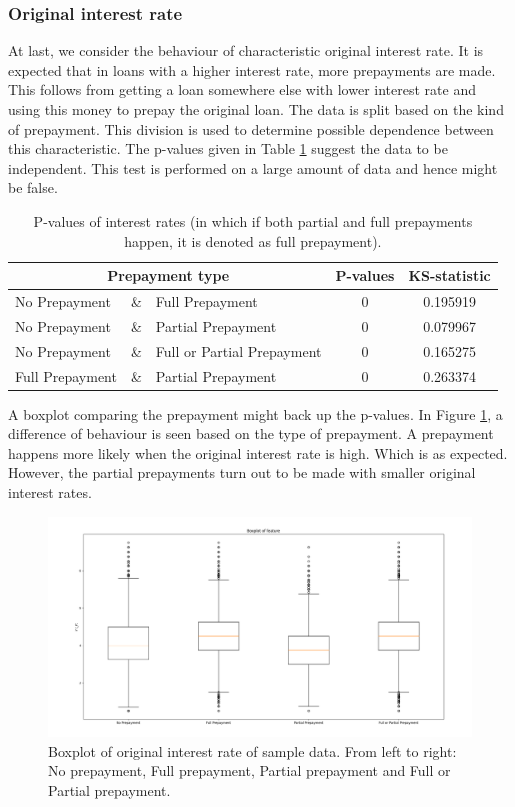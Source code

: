     \subsubsection{Original interest rate}
    At last, we consider the behaviour of characteristic original interest rate. It is expected that in loans with a higher interest rate, more prepayments are made. This follows from getting a loan somewhere else with lower interest rate and using this money to prepay the original loan. The data is split based on the kind of prepayment. This division is used to determine possible dependence between this characteristic. The p-values given in Table \ref{model_Pvals_of_int} suggest the data to be independent. This test is performed on a large amount of data and hence might be false. 
    \begin{table}[H]
        \centering
            \begin{tabular}{lcl|c|c}
            \multicolumn{3}{c}{Prepayment type} & P-values& KS-statistic \\\hline
            No Prepayment & \& & Full Prepayment & 0 & 0.195919\\
            No Prepayment & \& & Partial Prepayment & 0 & 0.079967\\
            No Prepayment & \& & Full or Partial Prepayment & 0 & 0.165275 \\
            Full Prepayment & \& & Partial Prepayment & 0 & 0.263374
		    \end{tabular}
            \caption{P-values of interest rates (in which if both partial and full prepayments happen, it is denoted as full prepayment).}
	        \label{model_Pvals_of_int}
        \end{table}
        \noindent
        A boxplot comparing the prepayment might back up the p-values. In Figure \ref{model_boxplot_int_rt}, a difference of behaviour is seen based on the type of prepayment. A prepayment happens more likely when the original interest rate is high. Which is as expected. However, the partial prepayments turn out to be made with smaller original interest rates. 
        \begin{figure}[H]
            \centering
            \includegraphics[width=\linewidth]{Latex/Report/Figures/Boxplot_of_int_rt_[2013, 2014, 2015, 2016, 2017, 2018, 2019, 2020]_.png}
            \caption{Boxplot of original interest rate of sample data. From left to right: No prepayment, Full prepayment, Partial prepayment and Full or Partial prepayment.}
            \label{model_boxplot_int_rt}
        \end{figure}
